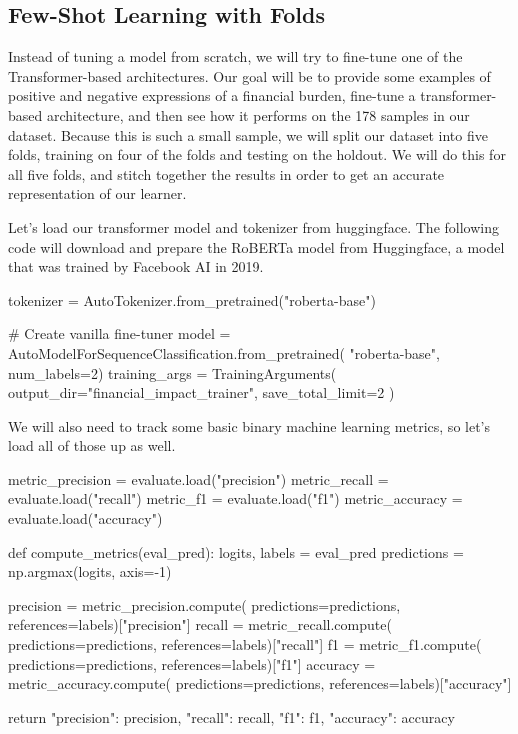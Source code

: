 \subsection{Few-Shot Learning with Folds}
Instead of tuning a model from scratch, we will try to fine-tune one of the Transformer-based architectures. Our goal will be to provide some examples of positive and negative expressions of a financial burden, fine-tune a transformer-based
architecture, and then see how it performs on the 178 samples in our dataset. Because this is such a small sample, we will split our dataset into five folds, training on four of the folds and testing on the holdout. We will do this for all
five folds, and stitch together the results in order to get an accurate representation of our learner.

Let's load our transformer model and tokenizer from huggingface. The following code will download and prepare the
RoBERTa\cite{liu2019roberta} model from Huggingface, a model that was trained by Facebook AI in 2019.

\begin{python}
tokenizer = AutoTokenizer.from_pretrained("roberta-base")

# Create vanilla fine-tuner
model = AutoModelForSequenceClassification.from_pretrained(
    "roberta-base", num_labels=2)
training_args = TrainingArguments(
    output_dir="financial_impact_trainer",
    save_total_limit=2
)
\end{python}

We will also need to track some basic binary machine learning metrics, so let's load all of those up as well.

\begin{python}
metric_precision = evaluate.load("precision")
metric_recall = evaluate.load("recall")
metric_f1 = evaluate.load("f1")
metric_accuracy = evaluate.load("accuracy")

def compute_metrics(eval_pred):
    logits, labels = eval_pred
    predictions = np.argmax(logits, axis=-1)

    precision = metric_precision.compute(
        predictions=predictions,
        references=labels)["precision"]
    recall = metric_recall.compute(
        predictions=predictions,
        references=labels)["recall"]
    f1 = metric_f1.compute(
        predictions=predictions,
        references=labels)["f1"]
    accuracy = metric_accuracy.compute(
        predictions=predictions,
        references=labels)["accuracy"]

    return {
        "precision": precision,
        "recall": recall,
        "f1": f1,
        "accuracy": accuracy
    }
\end{python}

